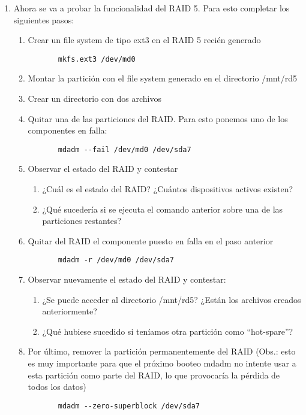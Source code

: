\begin{enumerate}
 \item Ahora se va a probar la funcionalidad del RAID 5. Para esto completar los siguientes pasos:
 \begin{enumerate}
  \item Crear un file system de tipo ext3 en el RAID 5 recién generado
    \begin{verbatim}
       mkfs.ext3 /dev/md0
    \end{verbatim}
  \item Montar la partición con el file system generado en el directorio /mnt/rd5
  \item Crear un directorio con dos archivos 
  \item Quitar una de las particiones del RAID. Para esto ponemos uno de los componentes en falla:
    \begin{verbatim}
       mdadm --fail /dev/md0 /dev/sda7 
    \end{verbatim}
  \item Observar el estado del RAID y contestar
  \begin{enumerate} 
   \item ¿Cuál es el estado del RAID? ¿Cuántos dispositivos activos existen?
   \item ¿Qué sucedería si se ejecuta el comando anterior sobre una de las particiones restantes?
  \end{enumerate}
  \item Quitar del RAID el componente puesto en falla en el paso anterior
    \begin{verbatim}
       mdadm -r /dev/md0 /dev/sda7
    \end{verbatim}
  \item Observar nuevamente el estado del RAID y contestar:
  \begin{enumerate}
   \item ¿Se puede acceder al directorio /mnt/rd5? ¿Están los archivos creados anteriormente?
   \item ¿Qué hubiese sucedido si teníamos otra partición como ``hot-spare''?
  \end{enumerate}
  \item Por último, remover la partición permanentemente del RAID (Obs.: esto es muy importante para que el próximo 
    booteo mdadm no intente usar a esta partición como parte del RAID, lo que provocaría la pérdida de todos los datos)	 
    \begin{verbatim} 
       mdadm --zero-superblock /dev/sda7
    \end{verbatim}

\end{enumerate}
\end{enumerate}
